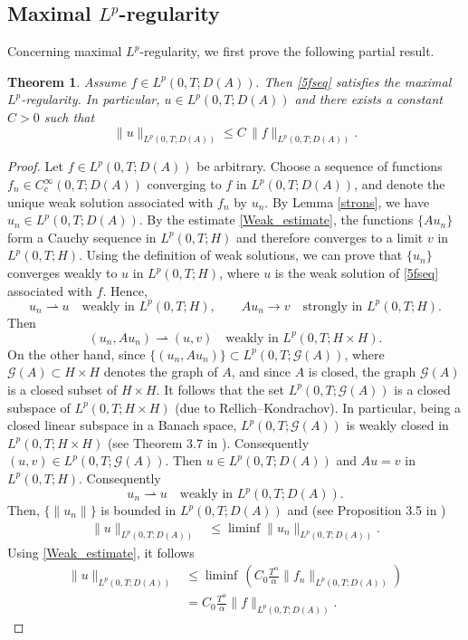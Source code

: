 \documentclass[reqno]{amsart}
\newtheorem{theorem}{Theorem}[section]
\numberwithin{equation}{section}
\begin{document}
\subsection{Maximal $L^p$-regularity}\label{sec52}
Concerning maximal $L^p$-regularity, we first prove the following partial result.
\begin{theorem}\label{bthmMRL^p}
Assume $f\in L^p(0,T;D(A)).$ Then \eqref{5fseq} satisfies the maximal $L^p$-regularity. In particular, $u\in L^p(0,T;D(A))$ and there exists a constant $C>0$ such that
\[
 \|u\|_{L^p(0,T;D(A))}\le C\,\|f\|_{L^p(0,T;D(A))}.
\]
\end{theorem}
\begin{proof}
Let $f \in L^{p}(0,T;D(A))$ be arbitrary. Choose a sequence of functions $f_{n} \in C_c^{\infty}(0, T;D(A))$ 
converging to $f$ in $L^{p}(0,T; D(A))$, and denote the unique weak solution 
associated with $f_{n}$ by $u_{n}$. By Lemma \ref{strons}, we have $u_n\in L^p(0,T;D(A))$.
By the estimate \eqref{Weak_estimate}, the functions $\{A u_{n}\}$ form a Cauchy sequence in $L^{p}(0,T;H)$ and therefore converges to a 
limit $v$ in $L^{p}(0,T;H)$. Using the definition of weak solutions, we can prove that \(\{u_{n}\}\) converges 
weakly to \(u\) in \(L^{p}(0,T;H)\), where \(u\) is the weak solution of 
\eqref{5fseq} associated with \(f\). Hence,
\[
u_n\rightharpoonup u\quad\text{weakly in }L^p(0,T;H),
\qquad Au_n\to v\quad\text{strongly in }L^p(0,T;H).
\]
Then 
\[
(u_n, Au_n)\rightharpoonup (u,v)\quad\text{weakly in }L^p(0,T;H\times H).
\]
On the other hand, since \(\{(u_n,Au_n)\}\subset L^p(0,T; \mathcal{G}(A))\), where 
\(\mathcal{G}(A)\subset H\times H\) denotes the graph of \(A\), and since \(A\) is closed, 
the graph \(\mathcal{G}(A)\) is a closed subset of \(H\times H\). 
It follows that the set $L^p(0,T;\mathcal{G}(A))$
is a closed subspace of \(L^p(0,T;H\times H)\) (due to Rellich–Kondrachov). 
In particular, being a closed linear subspace in a Banach space, 
\(L^p(0,T;\mathcal{G}(A))\) is weakly closed in \(L^p(0,T;H\times H)\) (see Theorem 3.7 in \cite{Bre2011}). Consequently
\((u,v)\in L^p(0,T;\mathcal{G}(A))\).
Then $u\in L^p(0,T;D(A))$ and $Au=v$ in $L^p(0,T;H)$. Consequently 
\[
u_n \rightharpoonup u\quad\text{weakly in }L^p(0,T;D(A)).
\]
Then, $\{\|u_n \|\}$ is bounded in $L^p(0,T;D(A))$ and (see Proposition 3.5 in \cite{Bre2011})
\begin{align*}
    \|u \|_{L^p(0,T;D(A))} &\le \liminf \|u_n \|_{L^p(0,T;D(A))}.
\end{align*}
Using \eqref{Weak_estimate}, it follows 
\begin{align*}
    \|u \|_{L^p(0,T;D(A))} &\le \liminf \,(C_0 \frac{T^\alpha}{\alpha} \|f_n\|_{L^p(0,T;D(A))})\\
    &= C_0 \frac{T^\alpha}{\alpha} \|f\|_{L^p(0,T;D(A))}.
\end{align*}
\end{proof}
\end{document}
